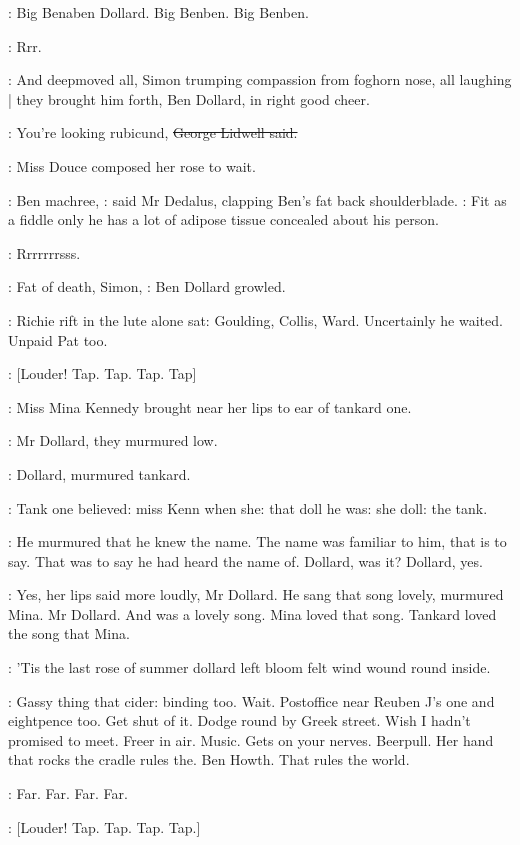 \BloomInt:
Big Benaben Dollard.
Big Benben.
Big Benben.

\BloomInt:
Rrr.

:
And deepmoved all,
Simon trumping compassion from foghorn nose,
all laughing |
they brought him forth,
Ben Dollard,
in right good cheer.

\lidwell:
You're looking rubicund,
\sout{George Lidwell said.}

:
Miss Douce composed her rose to wait.

\simon:
Ben machree,
:
said Mr Dedalus,
clapping Ben's fat back shoulderblade.
\simon:
Fit as a fiddle only he has a lot of adipose tissue concealed about his
person.

\BloomInt:
Rrrrrrrsss.

\dollard:
Fat of death,
Simon,
:
Ben Dollard growled.

:
Richie rift in the lute alone sat:
Goulding,
Collis,
Ward.
Uncertainly
he waited.
Unpaid Pat too.

\stripling:
[Louder!
Tap.
Tap.
Tap.
Tap]

:
Miss Mina Kennedy brought near her lips to ear of tankard one.

:
Mr Dollard,
they murmured low.

:
Dollard,
murmured tankard.

:
Tank one believed:
miss Kenn when she:
that doll he was:
she doll:
the tank.

:
He murmured that he knew the name.
The name was familiar to him,
that is to say.
That was to say he had heard the name of.
Dollard,
was it?
Dollard,
yes.

:
Yes,
her lips said more loudly,
Mr Dollard.
He sang that song lovely,
murmured Mina.
Mr Dollard.
And
 was a lovely
song.
Mina loved that song.
Tankard loved the song that Mina.

:
'Tis the last rose of summer dollard left bloom felt wind wound round
inside.

\BloomInt:
Gassy thing that cider:
binding too.
Wait.
Postoffice near Reuben J's
one and eightpence too.
Get shut of it.
Dodge round by Greek street.
Wish
I hadn't promised to meet.
Freer in air.
Music.
Gets on your nerves.
Beerpull.
Her hand that rocks the cradle rules the.
Ben Howth.
That rules
the world.

:
Far.
Far.
Far.
Far.

\stripling:
[Louder!
Tap.
Tap.
Tap.
Tap.]

